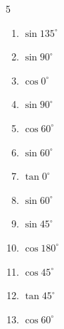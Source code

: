 \begin{multicols}{5}
\begin{enumerate}
  \item $\displaystyle \sin{135^\circ}$


  \item $\displaystyle \sin{90^\circ}$

        \phantom{$\displaystyle =1$}

  \item $\displaystyle \cos{0^\circ}$

        \phantom{$\displaystyle =1$}

  \item $\displaystyle \sin{90^\circ}$

        \phantom{$\displaystyle =1$}

\columnbreak %

  \item $\displaystyle \cos{60^\circ}$


  \item $\displaystyle \sin{60^\circ}$


  \item $\displaystyle \tan{0^\circ}$

        \phantom{$\displaystyle =0$}

  \item $\displaystyle \sin{60^\circ}$


  \item $\displaystyle \sin{45^\circ}$


  \item $\displaystyle \cos{180^\circ}$

        \phantom{$\displaystyle =-1$}

  \item $\displaystyle \cos{45^\circ}$


  \item $\displaystyle \tan{45^\circ}$

        \phantom{$\displaystyle =1$}

  \item $\displaystyle \cos{60^\circ}$


\end{enumerate}
\end{multicols}
